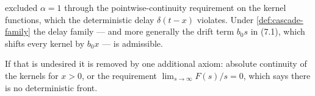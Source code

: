 \begin{remark}[the boundary case $\alpha = 1$ and the drift term]\label{rem:drift-boundary}
 excluded $\alpha = 1$ through the pointwise-continuity
requirement on the kernel functions, which the deterministic delay $\delta(t - x)$ violates.
Under \ref{def:cascade-family} the delay family --- and more generally the drift term $b_0 s$
in (7.1), which shifts every kernel by $b_0 x$ --- is admissible.

If that is undesired it is removed by one additional axiom: absolute continuity of the kernels
for $x > 0$, or the requirement $\lim_{s\to\infty} F(s)/s = 0$, which says there is no
deterministic front.
\end{remark}

